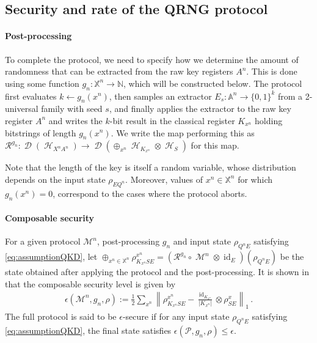 \documentclass[11pt]{article}
\DeclareMathOperator{\id}{id}
\newcommand{\1}{\ensuremath{\mathbbm{1}}}
\theoremstyle{newdefinition}
\theoremstyle{newplain}
\theoremstyle{myplain}
\DeclareMathOperator{\cH}{\mathcal{H}}
\DeclareMathOperator{\cM}{\mathcal{M}}
\DeclareMathOperator{\cD}{\mathcal{D}}
\begin{document}
\subsection{Security and rate of the QRNG protocol}
\paragraph{Post-processing}
To complete the protocol, we need to specify how we determine the amount of randomness that can be extracted from the raw key registers $A^n$. This is done using some function $g_n:\mathbb{X}^n\to \mathbb N$, which will be constructed below. The protocol first evaluates $k \leftarrow g_n(x^n)$, then samples an extractor $E_s: \mathbb{A}^n \to \{0,1\}^k$ from a 2-universal family with seed $s$, and finally applies the extractor to the raw key register $A^n$ and writes the $k$-bit result in the classical register $K_{x^n}$ holding bitstrings of length $g_n(x^n)$.
We write the map performing this as $\mathcal{R}^{g_n}: \cD(\cH_{X^nA^n}) \to \cD(\oplus_{x^n} \cH_{K_{x^n}} \otimes \cH_{S} )$ for this map.


Note that the length of the key is itself a random variable, whose distribution depends on the input state $\rho_{EQ^n}$. Moreover, values of $x^n\in \mathbb{X}^n$ for which $g_n(x^n)=0$, correspond to the cases where the protocol aborts.

\paragraph{Composable security}
For a given protocol $\mathcal{M}^n$, post-processing $g_n$ and input state $\rho_{Q^nE}$ satisfying \eqref{eq:assumptionQKD}, let $\oplus_{x^n \in \mathbb{X}^n} \rho_{K_{x^n}SE}^{x^n} = (\mathcal R^{g_n}\circ \cM^n \otimes \id_E)(\rho_{Q^nE})$ be the state obtained after applying the protocol and the post-processing. 
It is shown in \cite{Portmann_2022} that the composable security level is given by
\begin{align}
    \label{eq:security}
    \epsilon(\mathcal M^n,g_n,\rho) := \frac{1}{2} \sum_{x^n} \left\| \rho^{x^n}_{K_{x^n}SE} - \tfrac{\id_{K_{x^n}}}{|K_{x^n}|}\otimes \rho_{SE}^x \right\|_1\,.
\end{align}
The full protocol is said to be $\epsilon$-secure if for any input state $\rho_{Q^nE}$ satisfying \eqref{eq:assumptionQKD}, the final state
satisfies $\epsilon(\mathcal P,g_n,\rho)\leq \epsilon$.
\end{document}
